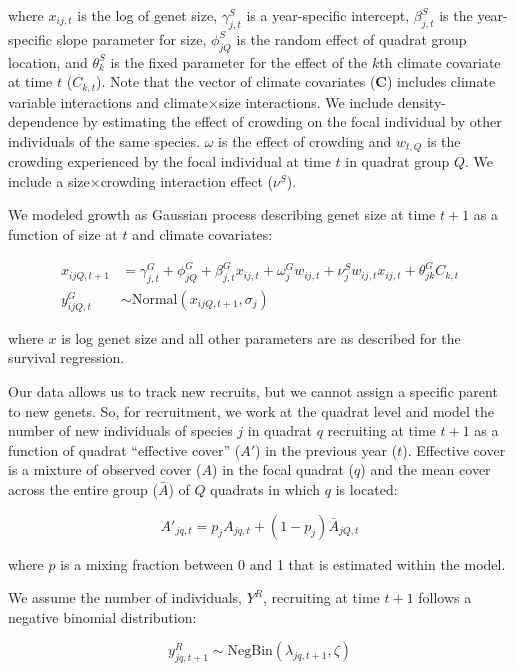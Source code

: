 \documentclass[12pt,]{article}
\begin{document}
where $x_{ij,t}$ is the log of genet size, $\gamma^{S}_{j,t}$ is a
year-specific intercept, $\beta^{S}_{j,t}$ is the year-specific slope
parameter for size, $\phi^{S}_{jQ}$ is the random effect of quadrat
group location, and $\theta^{S}_{k}$ is the fixed parameter for the
effect of the $k$th climate covariate at time $t$ ($C_{k,t}$). Note that
the vector of climate covariates (\textbf{C}) includes climate variable
interactions and climate$\times$size interactions. We include
density-dependence by estimating the effect of crowding on the focal
individual by other individuals of the same species. $\omega$ is the
effect of crowding and $w_{t,Q}$ is the crowding experienced by the
focal individual at time $t$ in quadrat group $Q$. We include a
size$\times$crowding interaction effect ($\nu^{S}$).

We modeled growth as Gaussian process describing genet size at time
$t+1$ as a function of size at $t$ and climate covariates:

\begin{align}
x_{ijQ,t+1} &= \gamma^{G}_{j,t} + \phi^{G}_{jQ} + \beta^{G}_{j,t}x_{ij,t} + \omega^{G}_{j}w_{ij,t} + \nu^{S}_{j}w_{ij,t}x_{ij,t} + \theta^{G}_{jk}C_{k,t} \\
y^{G}_{ijQ,t} &\sim \text{Normal}(x_{ijQ,t+1}, \sigma_{j})
\end{align}

where $x$ is log genet size and all other parameters are as described
for the survival regression.

Our data allows us to track new recruits, but we cannot assign a
specific parent to new genets. So, for recruitment, we work at the
quadrat level and model the number of new individuals of species $j$ in
quadrat $q$ recruiting at time $t+1$ as a function of quadrat
``effective cover'' ($A'$) in the previous year ($t$). Effective cover
is a mixture of observed cover ($A$) in the focal quadrat ($q$) and the
mean cover across the entire group ($\bar{A}$) of $Q$ quadrats in which
$q$ is located:

\begin{equation}
A'_{jq,t} = p_{j}A_{jq,t} + (1-p_{j})\bar{A}_{jQ,t}
\end{equation}

where $p$ is a mixing fraction between 0 and 1 that is estimated within
the model.

We assume the number of individuals, $Y^{R}$, recruiting at time $t+1$
follows a negative binomial distribution:

\begin{equation}
y^{R}_{jq,t+1} \sim \text{NegBin}(\lambda_{jq,t+1},\zeta)
\end{equation}
\end{document}
